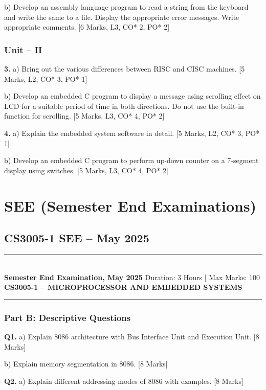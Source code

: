 \documentclass[11pt,a4paper]{article}
\newcommand{\examheader}[4]{
\noindent\rule{\textwidth}{0.5pt}\\
\textbf{#1} \hfill Duration: #3 | Max Marks: #4\\
\textbf{#2}\\
\rule{\textwidth}{0.5pt}
\vspace{0.2cm}
}
\begin{document}
b) Develop an assembly language program to read a string from the keyboard and write the same to a file. Display the appropriate error messages. Write appropriate comments. \hfill [6 Marks, L3, CO* 2, PO* 2]

\subsubsection*{Unit -- II}

\textbf{3.} a) Bring out the various differences between RISC and CISC machines. \hfill [5 Marks, L2, CO* 3, PO* 1]

b) Develop an embedded C program to display a message using scrolling effect on LCD for a suitable period of time in both directions. Do not use the built-in function for scrolling. \hfill [5 Marks, L3, CO* 4, PO* 2]

\textbf{4.} a) Explain the embedded system software in detail. \hfill [5 Marks, L2, CO* 3, PO* 1]

b) Develop an embedded C program to perform up-down counter on a 7-segment display using switches. \hfill [5 Marks, L3, CO* 4, PO* 2]

\vspace{0.5cm}

\section{SEE (Semester End Examinations)}

\subsection{CS3005-1 SEE -- May 2025}
\examheader{Semester End Examination, May 2025}{CS3005-1 -- MICROPROCESSOR AND EMBEDDED SYSTEMS}{3 Hours}{100}

\subsubsection*{Part B: Descriptive Questions}

\textbf{Q1.} a) Explain 8086 architecture with Bus Interface Unit and Execution Unit. \hfill [8 Marks]

b) Explain memory segmentation in 8086. \hfill [8 Marks]

\textbf{Q2.} a) Explain different addressing modes of 8086 with examples. \hfill [8 Marks]
\end{document}
